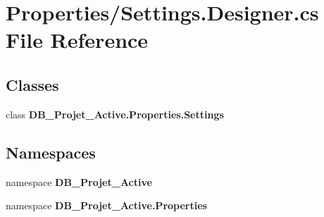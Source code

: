 \section{Properties/\+Settings.Designer.\+cs File Reference}
\label{_settings_8_designer_8cs}
\subsection*{Classes}
\begin{DoxyCompactItemize}
\item 
class \textbf{ D\+B\+\_\+\+Projet\+\_\+\+Active.\+Properties.\+Settings}
\end{DoxyCompactItemize}
\subsection*{Namespaces}
\begin{DoxyCompactItemize}
\item 
namespace \textbf{ D\+B\+\_\+\+Projet\+\_\+\+Active}
\item 
namespace \textbf{ D\+B\+\_\+\+Projet\+\_\+\+Active.\+Properties}
\end{DoxyCompactItemize}
